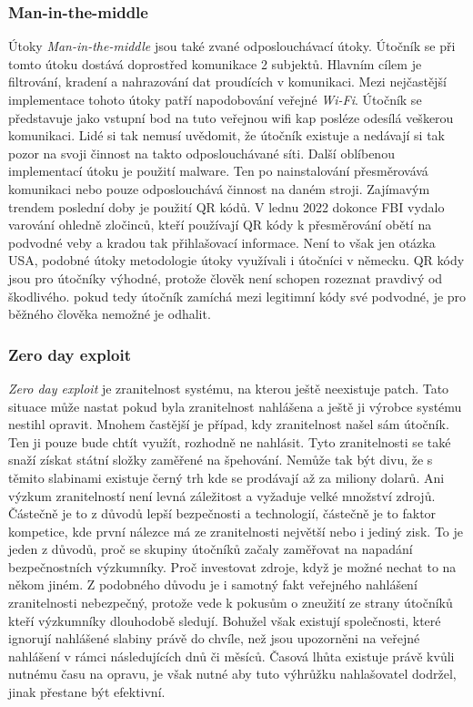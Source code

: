 \subsubsection{Man-in-the-middle}
Útoky \textit{Man-in-the-middle} jsou také zvané odposlouchávací útoky.
Útočník se při tomto útoku dostává doprostřed komunikace 2 subjektů.
Hlavním cílem je filtrování, kradení a nahrazování dat proudících v komunikaci.
Mezi nejčastější implementace tohoto útoky patří napodobování veřejné \textit{Wi-Fi}.
Útočník se představuje jako vstupní bod na tuto veřejnou wifi kap posléze odesílá veškerou komunikaci.
Lidé si tak nemusí uvědomit, že útočník existuje a nedávají si tak pozor na svoji činnost na takto odposlouchávané síti.
Další oblíbenou implementací útoku je použití malware.
Ten po nainstalování přesměrovává komunikaci nebo pouze odposlouchává činnost na daném stroji.
Zajímavým trendem poslední doby je použití QR kódů.
V lednu 2022 dokonce FBI vydalo varování ohledně zločinců, kteří používají QR kódy k přesměrování obětí na podvodné veby a kradou tak přihlašovací informace.
Není to však jen otázka USA, podobné útoky metodologie útoky využívali i útočníci v německu.
QR kódy jsou pro útočníky výhodné, protože člověk není schopen rozeznat pravdivý od škodlivého.
pokud tedy útočník zamíchá mezi legitimní kódy své podvodné, je pro běžného člověka nemožné je odhalit.\cite{Enisa_thread_landscape, cisco_most_common_attack}


\subsubsection{Zero day exploit}
\textit{Zero day exploit} je zranitelnost systému, na kterou ještě neexistuje patch.
Tato situace může nastat pokud byla zranitelnost nahlášena a ještě ji výrobce systému nestihl opravit.
Mnohem častější je případ, kdy zranitelnost našel sám útočník.
Ten ji pouze bude chtít využít, rozhodně ne nahlásit.
Tyto zranitelnosti se také snaží získat státní složky zaměřené na špehování.
Nemůže tak být divu, že s těmito slabinami existuje černý trh\cite{world_end_2021} kde se prodávají až za miliony dolarů.
Ani výzkum zranitelností není levná záležitost a vyžaduje velké množství zdrojů.
Částečně je to z důvodů lepší bezpečnosti a technologií, částečně je to faktor kompetice, kde první nálezce má ze zranitelnosti největší nebo i jediný zisk.
To je jeden z důvodů, proč se skupiny útočníků začaly zaměřovat na napadání bezpečnostních výzkumníky.
Proč investovat zdroje, když je možné nechat to na někom jiném.
Z podobného důvodu je i samotný fakt veřejného nahlášení zranitelnosti nebezpečný, protože vede k pokusům o zneužití ze strany útočníků kteří výzkumníky dlouhodobě sledují.
Bohužel však existují společnosti, které ignorují nahlášené slabiny právě do chvíle, než jsou upozorněni na veřejné nahlášení v rámci následujících dnů či měsíců.
Časová lhůta existuje právě kvůli nutnému času na opravu, je však nutné aby tuto výhrůžku nahlašovatel dodržel, jinak přestane být efektivní.\cite{Enisa_thread_landscape}


